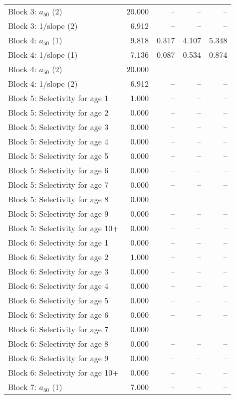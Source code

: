 \documentclass[
]{article}
\begin{document}
\begin{landscape}
\begin{longtable}[t]{lrrrr}
\addlinespace
Block 3: $a_{50}$ (2) & 20.000 & -- & -- & --\\
Block 3: 1/slope (2) & 6.912 & -- & -- & --\\
Block 4: $a_{50}$ (1) & 9.818 & 0.317 & 4.107 & 5.348\\
Block 4: 1/slope (1) & 7.136 & 0.087 & 0.534 & 0.874\\
Block 4: $a_{50}$ (2) & 20.000 & -- & -- & --\\
\addlinespace
Block 4: 1/slope (2) & 6.912 & -- & -- & --\\
Block 5: Selectivity for age 1 & 1.000 & -- & -- & --\\
Block 5: Selectivity for age 2 & 0.000 & -- & -- & --\\
Block 5: Selectivity for age 3 & 0.000 & -- & -- & --\\
Block 5: Selectivity for age 4 & 0.000 & -- & -- & --\\
\addlinespace
Block 5: Selectivity for age 5 & 0.000 & -- & -- & --\\
Block 5: Selectivity for age 6 & 0.000 & -- & -- & --\\
Block 5: Selectivity for age 7 & 0.000 & -- & -- & --\\
Block 5: Selectivity for age 8 & 0.000 & -- & -- & --\\
Block 5: Selectivity for age 9 & 0.000 & -- & -- & --\\
\addlinespace
Block 5: Selectivity for age 10+ & 0.000 & -- & -- & --\\
Block 6: Selectivity for age 1 & 0.000 & -- & -- & --\\
Block 6: Selectivity for age 2 & 1.000 & -- & -- & --\\
Block 6: Selectivity for age 3 & 0.000 & -- & -- & --\\
Block 6: Selectivity for age 4 & 0.000 & -- & -- & --\\
\addlinespace
Block 6: Selectivity for age 5 & 0.000 & -- & -- & --\\
Block 6: Selectivity for age 6 & 0.000 & -- & -- & --\\
Block 6: Selectivity for age 7 & 0.000 & -- & -- & --\\
Block 6: Selectivity for age 8 & 0.000 & -- & -- & --\\
Block 6: Selectivity for age 9 & 0.000 & -- & -- & --\\
\addlinespace
Block 6: Selectivity for age 10+ & 0.000 & -- & -- & --\\
Block 7: $a_{50}$ (1) & 7.000 & -- & -- & --\\

\end{longtable}
\end{landscape}
\end{document}
